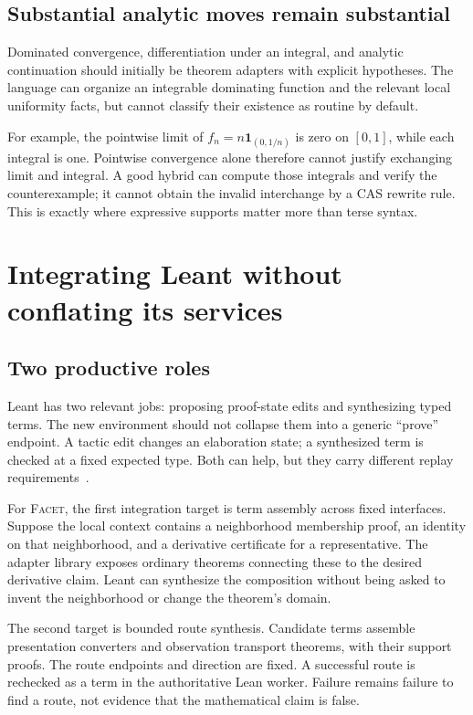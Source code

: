 \documentclass[11pt,a4paper]{article}
\newcommand{\Facet}{\textsc{Facet}}
\theoremstyle{definition}
\begin{document}
\subsection{Substantial analytic moves remain substantial}
Dominated convergence, differentiation under an integral, and analytic continuation
should initially be theorem adapters with explicit hypotheses. The language can
organize an integrable dominating function and the relevant local uniformity
facts, but cannot classify their existence as routine by default.

For example, the pointwise limit of
\(f_n=n\mathbf1_{(0,1/n)}\) is zero on \([0,1]\), while each integral is one.
Pointwise convergence alone therefore cannot justify exchanging limit and
integral. A good hybrid can compute those integrals and verify the counterexample;
it cannot obtain the invalid interchange by a CAS rewrite rule. This is exactly
where expressive supports matter more than terse syntax.

\section{Integrating Leant without conflating its services}\label{sec:leant}
\subsection{Two productive roles}
Leant has two relevant jobs: proposing proof-state edits and synthesizing typed
terms. The new environment should not collapse them into a generic ``prove''
endpoint. A tactic edit changes an elaboration state; a synthesized term is
checked at a fixed expected type. Both can help, but they carry different replay
requirements~\cite{l-main,l-fragment}.

For \Facet, the first integration target is term assembly across fixed interfaces.
Suppose the local context contains a neighborhood membership proof, an identity
on that neighborhood, and a derivative certificate for a representative. The
adapter library exposes ordinary theorems connecting these to the desired
derivative claim. Leant can synthesize the composition without being asked to
invent the neighborhood or change the theorem's domain.

The second target is bounded route synthesis. Candidate terms assemble
presentation converters and observation transport theorems, with their support
proofs. The route endpoints and direction are fixed. A successful route is
rechecked as a term in the authoritative Lean worker. Failure remains failure
to find a route, not evidence that the mathematical claim is false.
\end{document}
